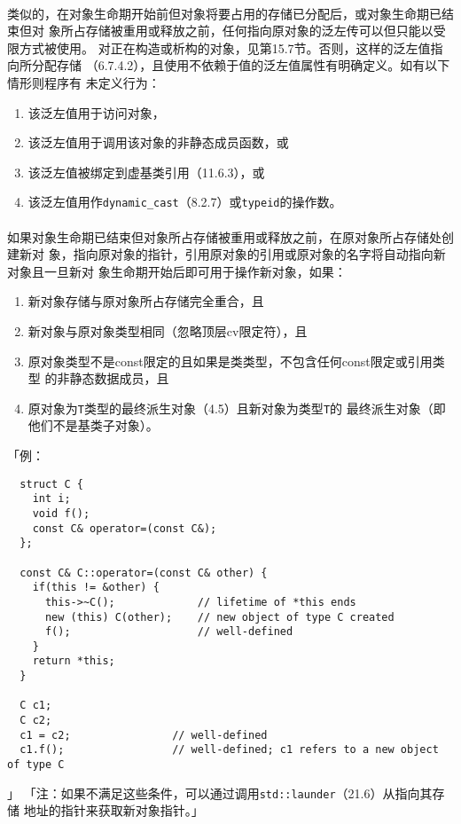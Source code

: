 \paragraph{}
类似的，在对象生命期开始前但对象将要占用的存储已分配后，或对象生命期已结束但对
象所占存储被重用或释放之前，任何指向原对象的泛左传可以但只能以受限方式被使用。
对正在构造或析构的对象，见第15.7节。否则，这样的泛左值指向所分配存储
（6.7.4.2），且使用不依赖于值的泛左值属性有明确定义。如有以下情形则程序有
未定义行为：
\begin{enumerate}
  \item{该泛左值用于访问对象，}
  \item{该泛左值用于调用该对象的非静态成员函数，或}
  \item{该泛左值被绑定到虚基类引用（11.6.3），或}
  \item{该泛左值用作\texttt{dynamic\_cast}（8.2.7）或\texttt{typeid}的操作数。}
\end{enumerate}

\paragraph{}
如果对象生命期已结束但对象所占存储被重用或释放之前，在原对象所占存储处创建新对
象，指向原对象的指针，引用原对象的引用或原对象的名字将自动指向新对象且一旦新对
象生命期开始后即可用于操作新对象，如果：
\begin{enumerate}
  \item{新对象存储与原对象所占存储完全重合，且}
  \item{新对象与原对象类型相同（忽略顶层cv限定符），且}
  \item{原对象类型不是const限定的且如果是类类型，不包含任何const限定或引用类型
    的非静态数据成员，且}
  \item{原对象为\texttt{T}类型的最终派生对象（4.5）且新对象为类型\texttt{T}的
    最终派生对象（即他们不是基类子对象）。}
\end{enumerate}
「例：
\begin{lstlisting}
  struct C {
    int i;
    void f();
    const C& operator=(const C&);
  };

  const C& C::operator=(const C& other) {
    if(this != &other) {
      this->~C();             // lifetime of *this ends
      new (this) C(other);    // new object of type C created
      f();                    // well-defined
    }
    return *this;
  }

  C c1;
  C c2;
  c1 = c2;                // well-defined
  c1.f();                 // well-defined; c1 refers to a new object of type C
\end{lstlisting}」
「注：如果不满足这些条件，可以通过调用\texttt{std::launder}（21.6）从指向其存储
地址的指针来获取新对象指针。」

